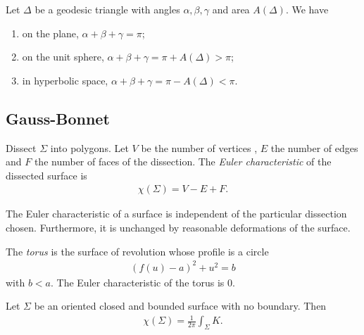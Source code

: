 \documentclass{article}
\begin{document}
\begin{corollary}
    Let $\Delta$ be a geodesic triangle with angles $\alpha,\beta,\gamma$ and area $A(\Delta)$.
    We have 
    \begin{enumerate}
        \item on the plane, $\alpha+\beta+\gamma = \pi$;
        \item on the unit sphere, $\alpha + \beta + \gamma = \pi + A(\Delta) > \pi$;
        \item in hyperbolic space, $\alpha + \beta + \gamma = \pi - A(\Delta) < \pi$.
    \end{enumerate}
\end{corollary}

\subsection{Gauss-Bonnet}

\begin{definition}
    Dissect $\Sigma$ into polygons. Let $V$ be the number of vertices , $E$ the number of edges
    and $F$ the number of faces of the dissection. The \emph{Euler characteristic} of the 
    dissected surface is 
    \begin{align*}
        \chi(\Sigma) = V - E + F.
    \end{align*}
\end{definition}

\begin{proposition}
    The Euler characteristic of a surface is independent of the particular dissection chosen.
    Furthermore, it is unchanged by reasonable deformations of the surface.
\end{proposition}

\begin{definition}
    The \emph{torus} is the surface of revolution whose profile is a circle 
    \begin{align*}
        (f(u)-a)^2 + u^2 = b
    \end{align*}
    with $b<a$. The Euler characteristic of the torus is $0$.
\end{definition}

\begin{theorem}
    Let $\Sigma$ be an oriented closed and bounded surface with no boundary. Then 
    \begin{align*}
        \chi(\Sigma) = \frac{1}{2\pi}\int_\Sigma K.
    \end{align*} 
\end{theorem}
\end{document}
